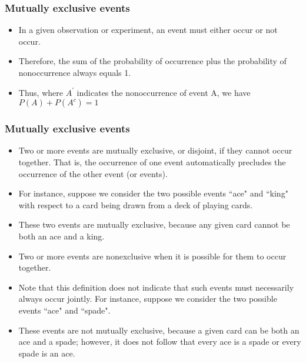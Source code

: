 \documentclass[IntroMain.tex]{subfiles}
\begin{document}
	\begin{frame} 
		\frametitle{Mutually exclusive events}
		\Large
		\begin{itemize}
			\item In a given observation or experiment, an event must either occur or not occur. \item Therefore, the sum of the
			probability of occurrence plus the probability of nonoccurrence always equals 1. \item Thus, where $A^{\prime}$ indicates the nonoccurrence of event A, we have
			$P(A) + P(A^{c}) =  1$
		\end{itemize}
	\end{frame}
	\begin{frame} 
		\frametitle{Mutually exclusive events}
		\Large
		\begin{itemize}
			\item 
			Two or more events are mutually exclusive, or disjoint, if they cannot occur together. That is, the occurrence
			of one event automatically precludes the occurrence of the other event (or events). 
			\item For instance, suppose we
			consider the two possible events ``ace" and ``king" with respect to a card being drawn from a deck of playing
			cards. 
			\item These two events are mutually exclusive, because any given card cannot be both an ace and a king.
			\item Two or more events are nonexclusive when it is possible for them to occur together.
		\end{itemize} 
	\end{frame}
	\begin{frame} 
		\Large
		\begin{itemize}
			\item Note that this definition does not indicate that such events must necessarily always occur jointly. For instance, suppose we consider the two possible events ``ace" and ``spade". 
			\item These events are not mutually exclusive, because a given card can be both an ace and a spade; however, it does not follow that every ace is a spade or every spade is an ace.
		\end{itemize}
	\end{frame}
\end{document}
